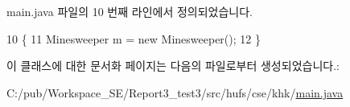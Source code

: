 main.\+java 파일의 10 번째 라인에서 정의되었습니다.


\begin{DoxyCode}
10                                            \{
11         Minesweeper m = \textcolor{keyword}{new} Minesweeper();
12     \}
\end{DoxyCode}


이 클래스에 대한 문서화 페이지는 다음의 파일로부터 생성되었습니다.\+:\begin{DoxyCompactItemize}
\item 
C\+:/pub/\+Workspace\+\_\+\+S\+E/\+Report3\+\_\+test3/src/hufs/cse/khk/\hyperlink{main_8java}{main.\+java}\end{DoxyCompactItemize}
